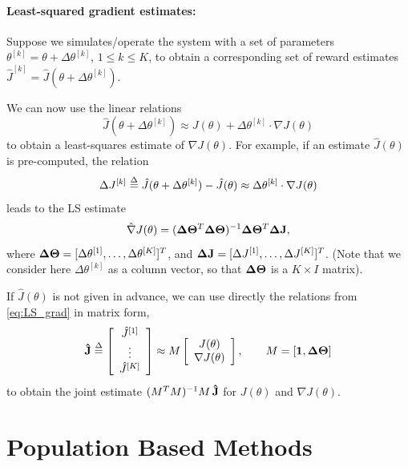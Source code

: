 \paragraph{Least-squared gradient estimates:}  Suppose we simulates/operate the system with a set of parameters ${\theta ^{[k]}} = \theta  + \Delta {\theta ^{[k]}}$, $1 \le k \le K$, to obtain a corresponding set of reward estimates ${\hat J^{[k]}} = \hat J(\theta  + \Delta {\theta ^{[k]}})$.

We can now use the linear relations
\begin{equation}\label{eq:LS_grad}
    \hat J(\theta  + \Delta {\theta ^{[k]}}) \approx J(\theta ) + \Delta {\theta ^{[k]}} \cdot \nabla J(\theta )
\end{equation}
to obtain a least-squares estimate of $\nabla J(\theta )$. For example, if an estimate $\hat J(\theta )$ is pre-computed, the relation
\[\Delta {J^{[k]}} \buildrel \Delta \over = \hat J(\theta  + \Delta {\theta ^{[k]}}) - \hat J(\theta ) \approx \Delta {\theta ^{[k]}} \cdot \nabla J(\theta )\]
leads to the LS estimate
\[\hat \nabla J(\theta ) = {({\bf{\Delta }}{{\bf{\Theta }}^T}{\bf{\Delta \Theta }})^{ - 1}}{\bf{\Delta }}{{\bf{\Theta }}^T}{\bf{\Delta J}},\]
where ${\bf{\Delta \Theta }} = {[\Delta {\theta ^{[1]}}, \ldots ,\Delta {\theta ^{[K]}}]^T}$, and ${\bf{\Delta J}} = {[\Delta {J^{[1]}}, \ldots ,\Delta {J^{[K]}}]^T}$.  (Note that we consider here $\Delta {\theta ^{[k]}}$ as a column vector, so that ${\bf{\Delta \Theta }}$ is a $K \times I$ matrix).

If $\hat J(\theta )$ is not given in advance, we can use directly the relations from \eqref{eq:LS_grad} in matrix form,
\[{\bf{\hat J}} \buildrel \Delta \over = \left[ {\begin{array}{*{20}{c}}
{{{\hat J}^{[1]}}}\\
 \vdots \\
{{{\hat J}^{[K]}}}
\end{array}} \right] \approx M\left[ {\begin{array}{*{20}{c}}
{J(\theta )}\\
{\nabla J(\theta )}
\end{array}} \right],\quad \quad M = [{\bf{1}},{\bf{\Delta \Theta }}]\]
to obtain the joint estimate ${({M^T}M)^{ - 1}}M\,{\bf{\hat J}}$ for $J(\theta )$ and $\nabla J(\theta )$.

\section{Population Based Methods}

